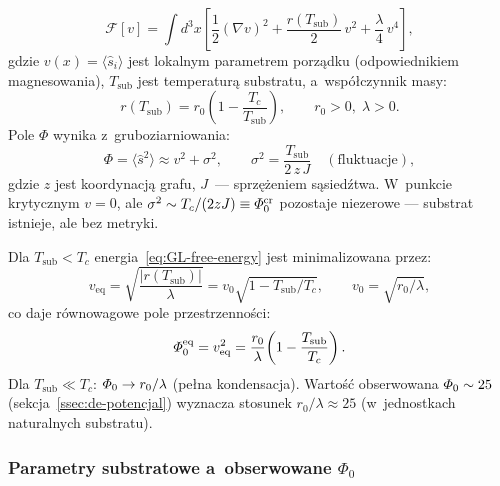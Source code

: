 \begin{equation}\label{eq:GL-free-energy}
    \mathcal{F}[v]
    = \int d^3x \left[
        \frac{1}{2}(\nabla v)^2
        + \frac{r(T_\mathrm{sub})}{2}\,v^2
        + \frac{\lambda}{4}\,v^4
    \right],
\end{equation}
gdzie $v(x) = \langle \hat{s}_i \rangle$ jest lokalnym
parametrem porz\k{a}dku (odpowiednikiem magnesowania),
$T_\mathrm{sub}$ jest temperatur\k{a} substratu,
a~wsp\'o\l{}czynnik masy:
\begin{equation}\label{eq:r-temperature}
    r(T_\mathrm{sub}) = r_0\!\left(1 - \frac{T_c}{T_\mathrm{sub}}\right),
    \qquad r_0 > 0,\;\lambda > 0.
\end{equation}
Pole $\Phi$ wynika z~gruboziarniowania:
\begin{equation}\label{eq:Phi-from-v}
    \Phi = \langle \hat{s}^2 \rangle \approx v^2 + \sigma^2,
    \qquad \sigma^2 = \frac{T_\mathrm{sub}}{2\,z\,J}
    \quad (\text{fluktuacje}),
\end{equation}
gdzie $z$ jest koordynacj\k{a} grafu, $J$~---
sprz\k{e}\.zeniem s\k{a}sied\'ztwa. W~punkcie krytycznym
$v = 0$, ale $\sigma^2 \sim T_c/(2zJ) \equiv \varPhi_0^{\mathrm{cr}}$
pozostaje niezerowe --- substrat istnieje, ale bez metryki.

\begin{proposition}\label{prop:veq}
Dla $T_\mathrm{sub} < T_c$ energia~\eqref{eq:GL-free-energy}
jest minimalizowana przez:
\begin{equation}\label{eq:veq}
    v_{\mathrm{eq}} = \sqrt{\frac{|r(T_\mathrm{sub})|}{\lambda}}
    = v_0\sqrt{1 - T_\mathrm{sub}/T_c},
    \qquad v_0 = \sqrt{r_0/\lambda},
\end{equation}
co daje r\'ownowagowe pole przestrzenno\'sci:
\begin{equation}\label{eq:Phi0-eq}
    \varPhi_0^{\mathrm{eq}}
    = v_{\mathrm{eq}}^2
    = \frac{r_0}{\lambda}\!\left(1 - \frac{T_\mathrm{sub}}{T_c}\right).
\end{equation}
Dla $T_\mathrm{sub} \ll T_c$: $\varPhi_0 \to r_0/\lambda$
(pe\l{}na kondensacja). Warto\'s\'c obserwowana $\varPhi_0 \sim 25$
(sekcja~\ref{ssec:de-potencjal}) wyznacza stosunek
$r_0/\lambda \approx 25$ (w~jednostkach naturalnych substratu).
\end{proposition}

\subsubsection{Parametry substratowe a~obserwowane $\Phi_0$}

